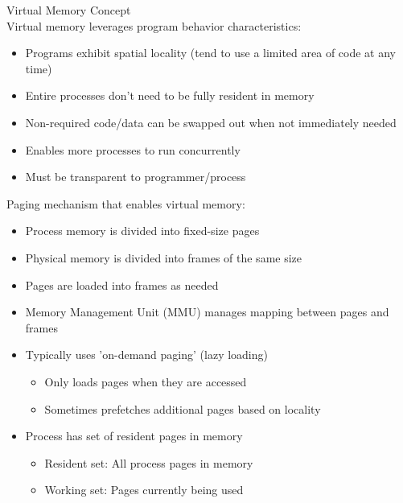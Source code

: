 
\begin{definition}{Virtual Memory Concept}\\
    Virtual memory leverages program behavior characteristics:
    \begin{itemize}
        \item Programs exhibit spatial locality (tend to use a limited area of code at any time)
        \item Entire processes don't need to be fully resident in memory
        \item Non-required code/data can be swapped out when not immediately needed
        \item Enables more processes to run concurrently
        \item Must be transparent to programmer/process
    \end{itemize}
\end{definition}

\begin{definition}{Paging} mechanism that enables virtual memory:
    \begin{itemize}
        \item Process memory is divided into fixed-size pages
        \item Physical memory is divided into frames of the same size
        \item Pages are loaded into frames as needed
        \item Memory Management Unit (MMU) manages mapping between pages and frames
        \item Typically uses 'on-demand paging' (lazy loading)
            \begin{itemize}
                \item Only loads pages when they are accessed
                \item Sometimes prefetches additional pages based on locality
            \end{itemize}
        \item Process has set of resident pages in memory
            \begin{itemize}
                \item Resident set: All process pages in memory
                \item Working set: Pages currently being used
            \end{itemize}
    \end{itemize}
\end{definition}

